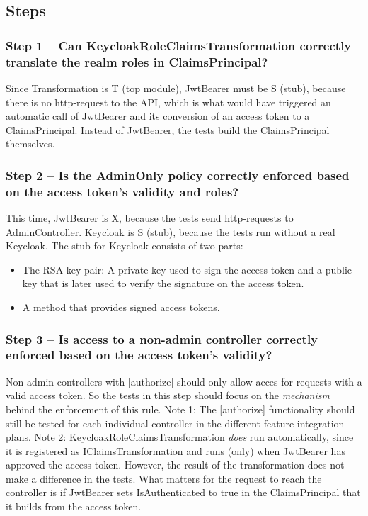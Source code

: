\documentclass[a4paper,11pt]{article}
\begin{document}
\subsection{Steps}

\subsubsection*{Step 1 -- Can KeycloakRoleClaimsTransformation correctly translate the realm roles in ClaimsPrincipal?}
Since Transformation is T (top module), JwtBearer must be S (stub), because there is no http-request to the API, which is what would have triggered an automatic call of JwtBearer and its conversion of an access token to a ClaimsPrincipal. Instead of JwtBearer, the tests build the ClaimsPrincipal themselves.

\subsubsection*{Step 2 -- Is the AdminOnly policy correctly enforced based on the access token's validity and roles?}
This time, JwtBearer is X, because the tests send http-requests to AdminController. Keycloak is S (stub), because the tests run without a real Keycloak. The stub for Keycloak consists of two parts:
\begin{itemize}
  \item The RSA key pair: A private key used to sign the access token and a public key that is later used to verify the signature on the access token.
  \item A method that provides signed access tokens.
\end{itemize}

\subsubsection*{Step 3 -- Is access to a non-admin controller correctly enforced based on the access token's validity?}
Non-admin controllers with [authorize] should only allow acces for requests with a valid access token.
So the tests in this step should focus on the \textit{mechanism} behind the enforcement of this rule.
Note 1: The [authorize] functionality should still be tested for each individual controller in the different feature integration plans.
Note 2: KeycloakRoleClaimsTransformation \textit{does} run automatically, since it is registered as IClaimsTransformation and runs (only) when JwtBearer has approved the access token.
However, the result of the transformation does not make a difference in the tests.
What matters for the request to reach the controller is if JwtBearer sets IsAuthenticated to true in the ClaimsPrincipal that it builds from the access token.
\end{document}
